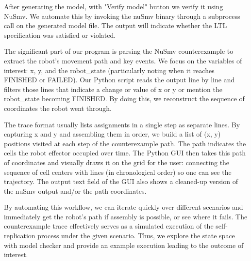 After generating the model, with "Verify model" button we verify it using NuSmv. 
We automate this by invoking the nuSmv binary through a subprocess 
call on the generated model file.
The output will indicate whether the LTL specification was satisfied or 
violated. 

The significant part of our program is parsing the NuSmv counterexample to extract the 
robot's movement path and key events. 
We focus on the variables of interest: x, y, and the robot\_state (particularly 
noting when it reaches FINISHED or FAILED). 
Our Python script reads the 
output line by line and filters those lines that indicate a change or 
value of x or y or mention the robot\_state becoming FINISHED. 
By doing this, we reconstruct the sequence of coordinates the robot went through. 

The trace format usually lists assignments in 
a single step as separate lines.
By capturing x and y and assembling them in order, we build a list of 
(x, y) positions visited at each step of the counterexample path. 
The path indicates the cells the robot effector occupied 
over time.
The Python GUI then takes this path of coordinates and visually 
draws it on the grid for the user: connecting the sequence of cell centers 
with lines (in chronological order) so one can see the trajectory. 
The output text field of the GUI also shows a cleaned-up version of 
the nuSmv output and/or the path coordinates.

By automating this workflow, we can iterate quickly over different scenarios 
and immediately get the robot’s path if assembly is possible, or see 
where it fails. The counterexample trace effectively serves as a simulated 
execution of the self-replication process under the given scenario. 
Thus, we explore the state space with model checker  and provide an 
example execution leading to the outcome of interest.






